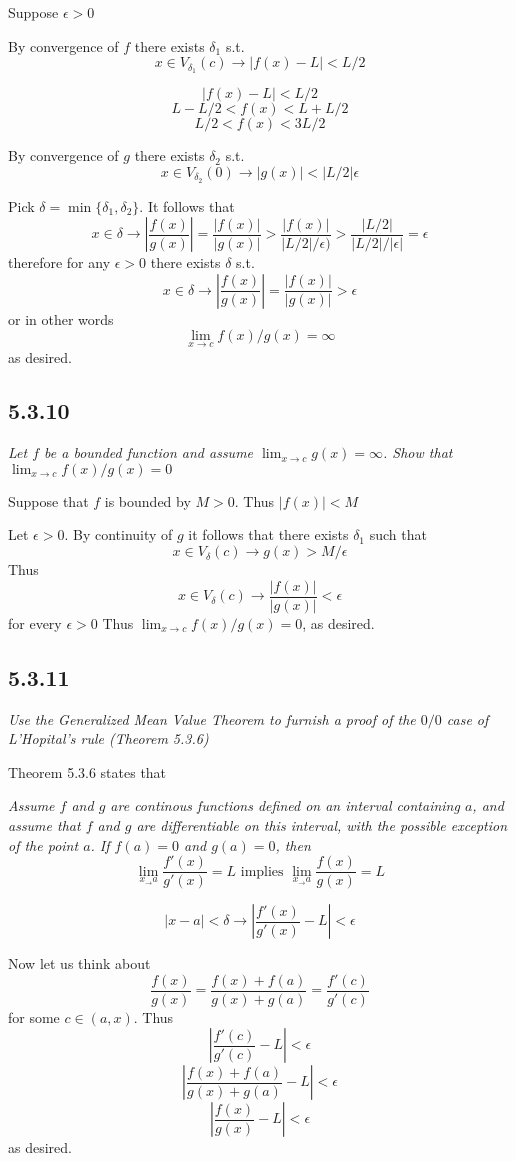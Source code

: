 \documentclass[11pt,oneside,titlepage]{book}
\begin{document}
Suppose $\epsilon > 0$

By convergence of $f$ there exists 
$\delta_1$ s.t.
$$x \in V_{\delta_1}(c) \to |f(x) - L| < L/2$$

$$|f(x) - L| < L/2$$
$$L - L/2 < f(x) < L + L/2$$
$$L/2 < f(x) < 3L/2$$

By convergence of $g$ there exists 
$\delta_2$ s.t.
$$x \in V_{\delta_2}(0) \to |g(x) | < |L/2|\epsilon$$

Pick $\delta = \min\{\delta_1, \delta_2\}$. It follows that 
$$x \in \delta \to |\frac{f(x)}{g(x)}| = \frac{|f(x)|}{|g(x)|} >
\frac{|f(x)|}{|L/2|/\epsilon)} > \frac{|L/2|}{ |L/2|/|\epsilon|} = \epsilon$$
therefore for any $\epsilon > 0$ there exists  $\delta$ s.t.
$$x \in \delta \to |\frac{f(x)}{g(x)}| = \frac{|f(x)|}{|g(x)|} > \epsilon$$
or in other words
$$\lim_{x \to c}{f(x)/g(x)} = \infty$$
as desired.

\subsection*{5.3.10}
\textit{Let $f$ be a bounded function and assume $\lim_{x \to c}g(x) = \infty$.
  Show that $\lim_{x \to c}f(x)/g(x) = 0$
}

Suppose that $f$ is bounded by $M > 0$. Thus $|f(x)| < M$

Let $\epsilon > 0$. By continuity of $g$ it follows that there exists
$\delta_1$ such that
$$x \in V_\delta(c) \to g(x) > M/\epsilon$$
Thus
$$x \in V_\delta(c) \to \frac{|f(x)|}{|g(x)|} < \epsilon$$
for every $\epsilon > 0$
Thus $\lim_{x \to c}f(x)/g(x) = 0$, as desired.

\subsection*{5.3.11}
\textit{Use the Generalized Mean Value Theorem to furnish a proof of the
  $0/0$ case of L'Hopital's rule (Theorem 5.3.6)}

Theorem 5.3.6 states that

\textit{Assume $f$ and $g$ are continous functions defined on an interval
  containing $a$, and assume that $f$ and $g$ are differentiable on this
  interval, with the possible exception of the point $a$. If $f(a) = 0$ and
  $g(a) = 0$, then }
$$\lim_{x_\to a}\frac{f'(x)}{g'(x)} = L \text{ implies }
\lim_{x_\to a}\frac{f(x)}{g(x)} = L$$

$$|x - a| < \delta \to \left|\frac{f'(x)}{g'(x)} - L\right| < \epsilon$$

Now let us think about
$$\frac{f(x)}{g(x)} = \frac{f(x) + f(a)}{g(x) + g(a)} = \frac{f'(c)}{g'(c)}$$
for some $c \in (a, x)$. Thus
$$\left|\frac{f'(c)}{g'(c)} - L\right| < \epsilon$$
$$\left|\frac{f(x) + f(a)}{g(x) + g(a)} - L\right|  < \epsilon$$
$$\left|\frac{f(x) }{g(x) } - L\right|  < \epsilon$$
as desired.
\end{document}
